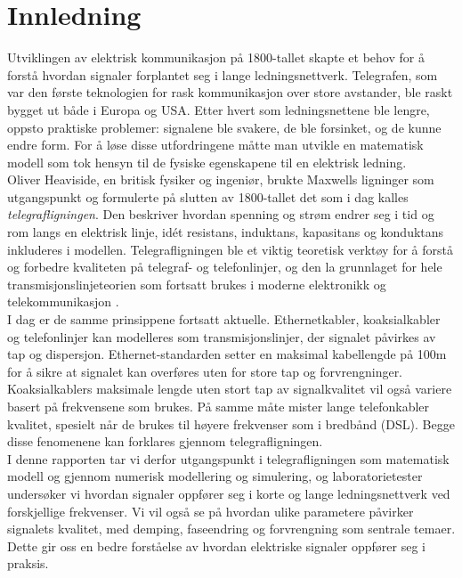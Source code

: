 \section{Innledning}

Utviklingen av elektrisk kommunikasjon på 1800-tallet skapte et behov for å forstå hvordan 
signaler forplantet seg i lange ledningsnettverk. Telegrafen, som var den første teknologien 
for rask kommunikasjon over store avstander, ble raskt bygget ut både i Europa og USA. Etter hvert 
som ledningsnettene ble lengre, oppsto praktiske problemer: signalene ble svakere, de ble 
forsinket, og de kunne endre form. For å løse disse utfordringene måtte man utvikle en matematisk 
modell som tok hensyn til de fysiske egenskapene til en elektrisk ledning.
\\[1em]
Oliver Heaviside, en britisk fysiker og ingeniør, brukte Maxwells ligninger som utgangspunkt og 
formulerte på slutten av 1800-tallet det som i dag kalles \textit{telegrafligningen}. Den beskriver 
hvordan spenning og strøm endrer seg i tid og rom langs en elektrisk linje, idét 
resistans, induktans, kapasitans og konduktans inkluderes i modellen. Telegrafligningen ble et viktig teoretisk verktøy 
for å forstå og forbedre kvaliteten på telegraf- og telefonlinjer, og den la grunnlaget for hele 
transmisjonslinjeteorien som fortsatt brukes i moderne elektronikk og telekommunikasjon \cite{geeksforgeeks_telegrapher}.
\\[1em]
I dag er de samme prinsippene fortsatt aktuelle. Ethernetkabler, koaksialkabler og telefonlinjer kan modelleres 
som transmisjonslinjer, der signalet påvirkes av tap og dispersjon. Ethernet-standarden setter en 
maksimal kabellengde på 100m for å sikre at signalet kan overføres uten for store tap og 
forvrengninger. Koaksialkablers maksimale lengde uten stort tap av signalkvalitet vil også variere basert på frekvensene som brukes. På samme måte mister lange telefonkabler kvalitet, spesielt når de brukes til høyere 
frekvenser som i bredbånd (DSL). Begge disse fenomenene kan forklares gjennom telegrafligningen.
\\[1em]
I denne rapporten tar vi derfor utgangspunkt i telegrafligningen som matematisk modell og gjennom numerisk
modellering og simulering, og laboratorietester undersøker vi hvordan signaler oppfører seg i korte og 
lange ledningsnettverk ved forskjellige frekvenser. Vi vil også se på hvordan ulike parametere påvirker 
signalets kvalitet, med demping, faseendring og forvrengning som sentrale temaer. Dette gir oss en bedre forståelse av
hvordan elektriske signaler oppfører seg i praksis. 